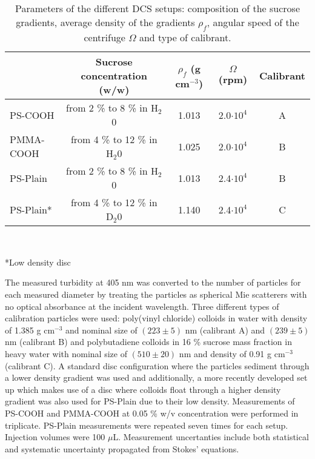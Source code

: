 \begin{table*}[]
\centering
\caption{Parameters of the different DCS setups: composition of the sucrose gradients, average density of the gradients $\rho_f$, angular speed of the centrifuge $\Omega$ and type of calibrant.}
\label{tab:DCSParameters}
\begin{tabular}{l|c|c|c|c|}
\cline{2-5}
\multicolumn{1}{c|}{}                         & Sucrose concentration (w/w)    & $\rho_f$ (g cm$^{-3}$) & $\Omega$ (rpm)  & Calibrant \\ \hline
\multicolumn{1}{|l|}{PS-COOH}    & from 2 \% to 8 \% in H$_2$0  & 1.013                  & 2.0$\cdot 10^4$                  & A         \\ \hline
\multicolumn{1}{|l|}{PMMA-COOH}  & from 4 \% to 12 \% in H$_2$0 & 1.025                  & 2.0$\cdot 10^4$                  & B         \\ \hline
\multicolumn{1}{|l|}{PS-Plain}      & from 2 \% to 8 \% in H$_2$0  & 1.013     & 2.4$\cdot 10^4$                  & B        \\ \hline
\multicolumn{1}{|l|}{PS-Plain*} & from 4 \% to 12 \% in D$_2$0 & 1.140     & 2.4$\cdot 10^4$                  & C         \\ \hline

\end{tabular}\\[0.3\baselineskip]
\begin{minipage}{15cm}
	\begin{raggedright}
	*\small{Low density disc}
	\end{raggedright}
\end{minipage}
\label{tab:composition}
\end{table*}

The measured turbidity at 405 nm was converted to the number of particles for each measured diameter by treating the particles as spherical Mie scatterers with no optical absorbance at the incident wavelength. Three different types of calibration particles were used: poly(vinyl chloride) colloids in water with density of 1.385 g cm$^{-3}$ and nominal size of $(223\pm5)$ nm (calibrant A) and $(239\pm5)$ nm (calibrant B) and polybutadiene colloids in 16 \% sucrose mass fraction in heavy water with nominal size of $(510\pm20)$ nm and density of 0.91 g cm$^{-3}$ (calibrant C). A standard disc configuration where the particles sediment through a lower density gradient was used and additionally, a more recently developed set up which makes use of a disc where colloids float through a higher density gradient was also used for PS-Plain due to their low density\citep{fitzpatrick_structure_1998}. Measurements of PS-COOH and PMMA-COOH at 0.05 \% w/v concentration were performed in triplicate. PS-Plain measurements were repeated seven times for each setup. Injection volumes were 100 $\mu$L. Measurement uncertanties include both statistical and systematic uncertainty propagated from Stokes' equations.

